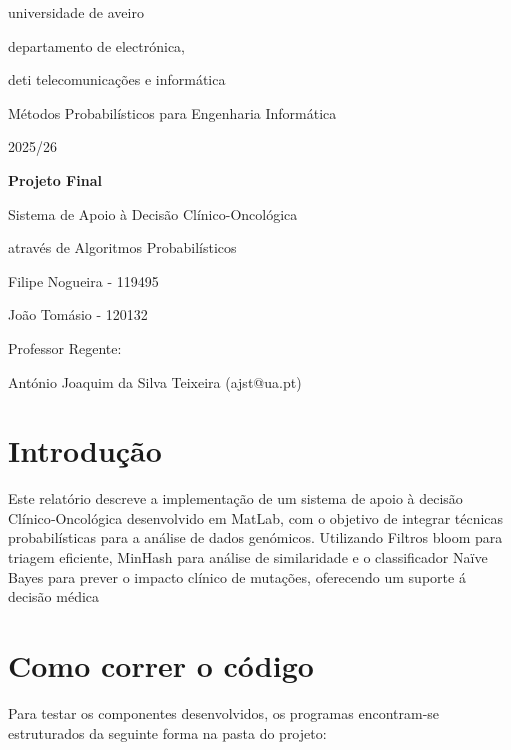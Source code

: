 \documentclass[11pt,a4paper]{article}
\begin{document}
\begin{titlepage}
    \centering
    \vspace*{1cm}
    
    {\large universidade de aveiro \par}
    {\large departamento de electrónica, \par deti telecomunicações e informática \par}
    
    \vspace{2.5cm}
    
    {\Large Métodos Probabilísticos para Engenharia Informática \par 2025/26 \par}
    
    \vspace{2.5cm}
    
    {\huge\bfseries Projeto Final \par Sistema de Apoio à Decisão Clínico-Oncológica \par através de Algoritmos Probabilísticos \par}
    
    \vspace{3cm}
    
    
    {\Large Filipe Nogueira - 119495 \par João Tomásio - 120132 \par}
    
    \vfill
    
    {\large Professor Regente: \par António Joaquim da Silva Teixeira (ajst@ua.pt) \par}
    
    \vspace*{1cm}
\end{titlepage}

\newpage

\section*{Introdução}
Este relatório descreve a implementação de um sistema de apoio à decisão Clínico‑Oncológica desenvolvido em MatLab, com o objetivo de integrar técnicas probabilísticas para a análise de dados genómicos. Utilizando Filtros bloom para triagem eficiente, MinHash para análise de similaridade e o classificador Naïve Bayes para prever o impacto clínico de mutações, oferecendo um suporte á decisão médica
\section*{Como correr o código}
Para testar os componentes desenvolvidos, os programas encontram-se estruturados da seguinte forma na pasta do projeto:
\end{document}
